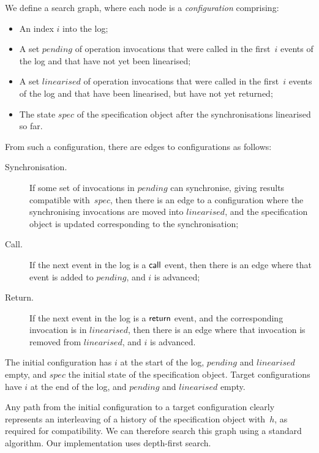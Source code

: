 We define a search graph, where each node is a \emph{configuration}
comprising:
%
\begin{itemize}
\item An index $i$ into the log;

\item A set $pending$ of operation invocations that were called in the
  first~$i$ events of the log and that have not yet been linearised;

\item A set $linearised$ of operation invocations that were called in the
  first~$i$ events of the log and that have been linearised, but have not yet
  returned;

\item The state $spec$ of the specification object after the synchronisations
  linearised so far.
\end{itemize}
%
From such a configuration, there are edges to configurations as follows:
%
\def\edgeFont#1{\rm\textsf{#1}}
\begin{description}
\item[\edgeFont{Synchronisation}.] If some set of invocations in $pending$ can
  synchronise, giving results compatible with~$spec$, then there is an edge to
  a configuration where the synchronising invocations are moved into
  $linearised$, and the specification object is updated corresponding to the
  synchronisation;

\item[\edgeFont{Call}.] If the next event in the log is a $\mathsf{call}$ event, then
  there is an edge where that event is added to $pending$, and $i$ is
  advanced;

\item[\edgeFont{Return}.] If the next event in the log is a $\mathsf{return}$ event,
  and the corresponding invocation is in $linearised$, then there is an edge
  where that invocation is removed from $linearised$, and $i$ is advanced.
\end{description}
%
The initial configuration has $i$ at the start of the log, $pending$ and
$linearised$ empty, and $spec$ the initial state of the specification object.
Target configurations have $i$ at the end of the log, and $pending$ and
$linearised$ empty.

Any path from the initial configuration to a target configuration clearly
represents an interleaving of a history of the specification object with~$h$,
as required for compatibility.  We can therefore search this graph using a
standard algorithm.  Our implementation uses depth-first search.

